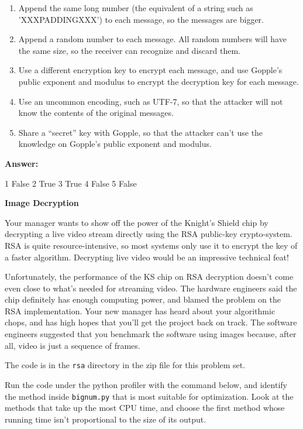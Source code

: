 \documentclass[12pt,twoside]{article}
\newcommand{\answer}{
 \par\medskip
 \textbf{Answer:}
}
\newcommand{\answerIIf}{ \answer
1 False
2 True
3 True
4 False
5 False
}
\begin{document}
\begin{problems}
\begin {problemparts}
\begin{enumerate}
  \item Append the same long number (the equivalent of a string such as
  'XXXPADDINGXXX') to each message, so the messages are bigger.
  \item Append a random number to each message. All random numbers will have the
  same size, so the receiver can recognize and discard them.
  \item Use a different encryption key to encrypt each message, and use Gopple's
  public exponent and modulus to encrypt the decryption key for each message.
  \item Use an uncommon encoding, such as UTF-7, so that the attacker will not
  know the contents of the original messages.
  \item Share a ``secret'' key with Gopple, so that the attacker can't use the
  knowledge on Gopple's public exponent and modulus.
\end{enumerate}
\answerIIf

\end{problemparts}

\newpage

\problem {} \textbf{Image Decryption}

Your manager wants to show off the power of the Knight's Shield chip by
decrypting a live video stream directly using the RSA public-key crypto-system.
RSA is quite resource-intensive, so most systems only use it to encrypt the key
of a faster algorithm. Decrypting live video would be an impressive technical
feat!

Unfortunately, the performance of the KS chip on RSA decryption doesn't come
even close to what's needed for streaming video. The hardware engineers said the
chip definitely has enough computing power, and blamed the problem on the
RSA implementation. Your new manager has heard about your algorithmic chops, and
has high hopes that you'll get the project back on track. The software engineers
suggested that you benchmark the software using images because, after all, video
is just a sequence of frames.

The code is in the \texttt{rsa} directory in the zip file for this problem set.

\begin{problemparts}
\problempart {} Run the code under the python profiler with the command
below, and identify the method inside \texttt{bignum.py} that is most suitable
for optimization. Look at the methods that take up the most CPU time, and
choose the first method whose running time isn't proportional to the size of its
output.


\end{problemparts}
\end{problems}
\end{document}
